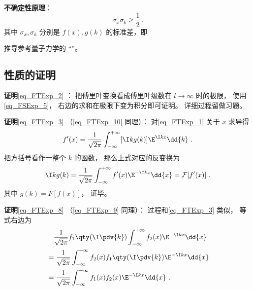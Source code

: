 \textbf{不确定性原理}：
\begin{equation}
\sigma_x \sigma_k \geqslant \frac{1}{2}~.
\end{equation}
其中 $\sigma_x, \sigma_k$ 分别是 $f(x), g(k)$ 的标准差，即
\begin{equation}

\end{equation}

推导参考量子力学的 “”。

\subsection{性质的证明}

\textbf{证明}\autoref{eq_FTExp_2} ： 把傅里叶变换看成傅里叶级数在 $l \to \infty$ 时的极限， 使用\autoref{eq_FSExp_5}， 右边的求和在极限下变为积分即可证明。 详细过程留做习题。

\textbf{证明}\autoref{eq_FTExp_3} （\autoref{eq_FTExp_10} 同理）： 对\autoref{eq_FTExp_1} 关于 $x$ 求导得
\begin{equation}
f'(x) = \frac{1}{\sqrt{2\pi }} \int_{-\infty }^{+\infty } [\I kg(k)]\E^{\I kx} \dd{k}~.
\end{equation}
把方括号看作一整个 $k$ 的函数， 那么上式对应的反变换为
\begin{equation}
\I kg(k) = \frac{1}{\sqrt{2\pi }} \int_{-\infty }^{+\infty } f'(x) \E^{-\I kx} \dd{x} = \mathcal F [f'(x)]~.
\end{equation}
其中 $g(k) = F [f(x)]$， 证毕。

\textbf{证明}\autoref{eq_FTExp_8} （\autoref{eq_FTExp_9} 同理）： 过程和\autoref{eq_FTExp_3} 类似， 等式右边为
\begin{equation}
\begin{aligned}
& \quad \frac{1}{\sqrt{2\pi }} f_1\qty(\I \pdv{k}) \int_{-\infty }^{+\infty } f_2(x)\E^{-\I kx} \dd{x}\\
&= \frac{1}{\sqrt{2\pi }} \int_{-\infty }^{+\infty } f_2(x) f_1\qty(\I \pdv{k})\E^{-\I kx} \dd{x}\\
&= \frac{1}{\sqrt{2\pi }} \int_{-\infty }^{+\infty } f_1(x) f_2(x) \E^{-\I kx} \dd{x}~.
\end{aligned}
\end{equation}
